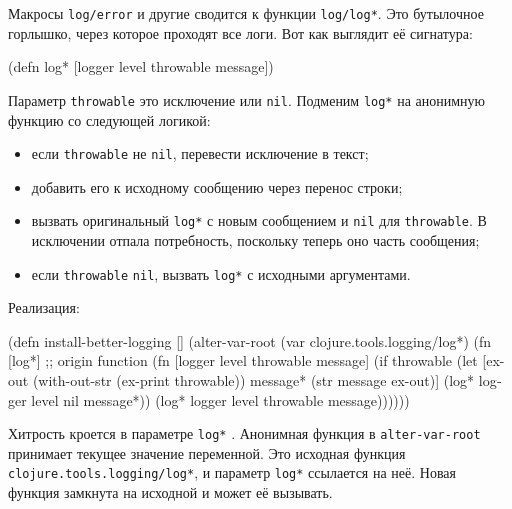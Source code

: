 
Макросы \verb|log/error| и другие сводится к функции \verb|log/log*|. Это
бутылочное горлышко, через которое проходят все логи. Вот как выглядит её
сигнатура:

\begin{english}
  \begin{clojure}
(defn log* [logger level throwable message])
  \end{clojure}
\end{english}

Параметр \verb|throwable| это исключение или \verb|nil|. Подменим
\verb|log*| на анонимную функцию со следующей логикой:

\begin{itemize}

\item
  если \verb|throwable| не \verb|nil|, перевести исключение в текст;

\item
  добавить его к исходному сообщению через перенос строки;

\item
  вызвать оригинальный \verb|log*| с новым сообщением и \verb|nil| для
  \verb|throwable|. В исключении отпала потребность, поскольку теперь оно
  часть сообщения;

\item
  если \verb|throwable| \verb|nil|, вызвать \verb|log*| с исходными
  аргументами.

\end{itemize}

\noindent
Реализация:


\begin{english}
  \begin{clojure/lines}
(defn install-better-logging []
  (alter-var-root
   (var clojure.tools.logging/log*)
   (fn [log*] ;; origin function
     (fn [logger level throwable message]
       (if throwable
         (let [ex-out (with-out-str (ex-print throwable))
               message* (str message \newline ex-out)]
           (log* logger level nil message*))
         (log* logger level throwable message))))))
  \end{clojure/lines}
\end{english}

Хитрость кроется в параметре \verb|log*| . Анонимная функция в
\verb|alter-var-root| принимает текущее значение переменной. Это исходная
функция \verb|clojure.tools.logging/log*|, и параметр \verb|log*| ссылается
на неё. Новая функция замкнута на исходной и может её вызывать.

